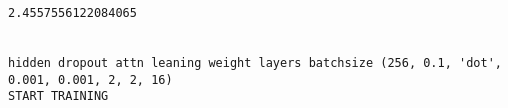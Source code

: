\documentclass[11pt]{article}
\begin{document}
    \begin{center}
    \end{center}
    { \hspace*{\fill} \\}
    
    \begin{center}
    \end{center}
    { \hspace*{\fill} \\}
    
    \begin{Verbatim}[commandchars=\\\{\}]
2.4557556122084065


hidden dropout attn leaning weight layers batchsize (256, 0.1, 'dot', 0.001, 0.001, 2, 2, 16)
START TRAINING



    \end{Verbatim}

    \begin{center}
    \end{center}
    { \hspace*{\fill} \\}
    
    \begin{center}
    \end{center}
    { \hspace*{\fill} \\}
    
    \begin{center}
    \end{center}
    { \hspace*{\fill} \\}
    
    \begin{center}
    \end{center}
    { \hspace*{\fill} \\}
    
    \begin{center}
    \end{center}
    { \hspace*{\fill} \\}
    
\end{document}

